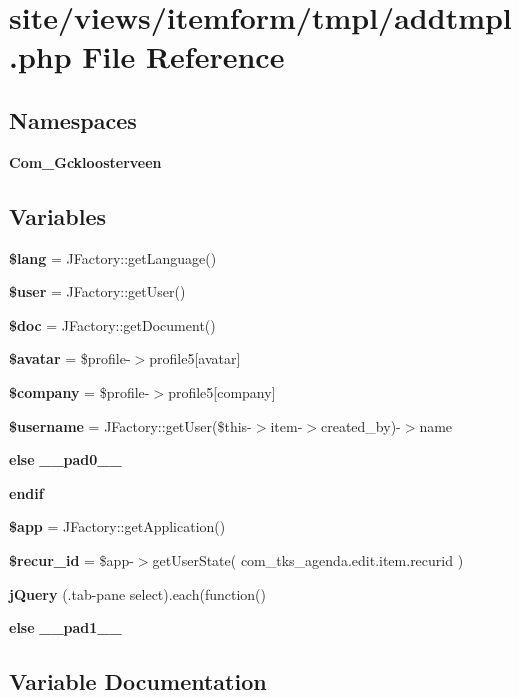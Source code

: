 \section{site/views/itemform/tmpl/addtmpl.php File Reference}
\label{addtmpl_8php}
\subsection*{Namespaces}
\begin{DoxyCompactItemize}
\item 
 \textbf{ Com\+\_\+\+Gckloosterveen}
\end{DoxyCompactItemize}
\subsection*{Variables}
\begin{DoxyCompactItemize}
\item 
\textbf{ \$lang} = J\+Factory\+::get\+Language()
\item 
\textbf{ \$user} = J\+Factory\+::get\+User()
\item 
\textbf{ \$doc} = J\+Factory\+::get\+Document()
\item 
\textbf{ \$avatar} = \$profile-\/$>$profile5[\textquotesingle{}avatar\textquotesingle{}]
\item 
\textbf{ \$company} = \$profile-\/$>$profile5[\textquotesingle{}company\textquotesingle{}]
\item 
\textbf{ \$username} = J\+Factory\+::get\+User(\$this-\/$>$item-\/$>$created\+\_\+by)-\/$>$name
\item 
\textbf{ else} \textbf{ \+\_\+\+\_\+pad0\+\_\+\+\_\+}
\item 
\textbf{ endif}
\item 
\textbf{ \$app} = J\+Factory\+::get\+Application()
\item 
\textbf{ \$recur\+\_\+id} = \$app-\/$>$get\+User\+State( \textquotesingle{}com\+\_\+tks\+\_\+agenda.\+edit.\+item.\+recurid\textquotesingle{} )
\item 
\textbf{ j\+Query} (\textquotesingle{}.tab-\/pane select\textquotesingle{}).each(function()
\item 
\textbf{ else} \textbf{ \+\_\+\+\_\+pad1\+\_\+\+\_\+}
\end{DoxyCompactItemize}


\subsection{Variable Documentation}
\mbox{\label{addtmpl_8php_adfb117f244076aa9bc269269f7e57403}} 
